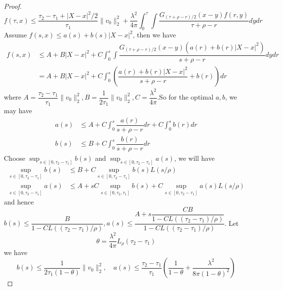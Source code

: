 \begin{proof}
    \[
    f(\tau,x) \leq \dfrac{\tau_2-\tau_1 + |X-x|^2/2}{\tau_1}\lVert v_0\rVert_2^2 + \dfrac{\lambda^2}{4\pi} \int_0^{\tau}\int \dfrac{G_{(\tau+\rho-r)/2}(x-y)f(r,y)}{\tau+\rho-r} dydr
    \]
    Assume $f(s,x) \leq a(s) + b(s)|X-x|^2$, then we have
    \[
    \begin{aligned}
        f(s,x) &\leq A + B|X-x|^2 + C\int_0^{s}\int\dfrac{G_{(\tau+\rho-r)/2}(x-y)(a(r) + b(r)|X-x|^2)}{s+\rho-r} dydr \\
        &= A + B|X-x|^2 + C\int_0^s \left(\dfrac{a(r)+b(r)|X-x|^2}{s+\rho-r} + b(r)\right)dr
    \end{aligned}
    \]
    where $A = \dfrac{\tau_2-\tau_1}{\tau_1}\lVert v_0\rVert_2^2, B= \dfrac{1}{2\tau_1}\lVert v_0\rVert_2^2, C = \dfrac{\lambda^2}{4\pi}$.So for the optimal $a,b$, we may have
    \[
    \begin{aligned}
        a(s) &\leq A + C\int_0^s \dfrac{a(r)}{s+\rho-r} dr + C\int_0^s b(r) dr \\
        b(s) &\leq B + C \int_0^s \dfrac{b(r)}{s+\rho-r} dr
    \end{aligned}
    \]
    Choose $\sup_{s\in[0,\tau_2-\tau_1]} b(s)$ and $\sup_{s\in[0,\tau_2-\tau_1]} a(s)$, we will have
    \[
    \begin{aligned}
        \sup_{s\in[0,\tau_2-\tau_1]} b(s) &\leq B + C \sup_{s\in[0,\tau_2-\tau_1]}b(s)L(s/\rho) \\
        \sup_{s\in[0,\tau_2-\tau_1]} a(s) &\leq A + sC\sup_{s\in[0,\tau_2,\tau_1]}b(s)+ C \sup_{s\in[0,\tau_2-\tau_1]}a(s)L(s/\rho) 
    \end{aligned}
    \]
    and hence $b(s) \leq \dfrac{B}{1-CL((\tau_2-\tau_1)/\rho)}, a(s) \leq \dfrac{A+s\dfrac{CB}{1-CL((\tau_2-\tau_1)/\rho)}}{1-CL((\tau_2-\tau_1)/\rho)}$. Let
    \[
    \theta = \dfrac{\lambda^2}{4\pi}L_{\rho}(\tau_2-\tau_1)
    \]
    we have
    \[
    b(s) \leq \dfrac{1}{2\tau_1(1-\theta)}\lVert v_0\rVert_2^2,\quad a(s) \leq \dfrac{\tau_2-\tau_1}{\tau_1}\left(\dfrac{1}{1-\theta} + \dfrac{\lambda^2}{8\pi(1-\theta)^2}\right)
    \]
\end{proof}

